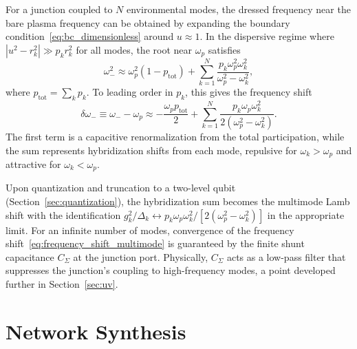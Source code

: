 \documentclass[reprint, floatfix, superscriptaddress, amsmath, amssymb, longbibliography]{revtex4-2}
\begin{document}
For a junction coupled to $N$ environmental modes, the dressed frequency near the bare plasma frequency can be obtained by expanding the boundary condition~\eqref{eq:bc_dimensionless} around $u \approx 1$. In the dispersive regime where $|u^2 - r_k^2| \gg p_k r_k^2$ for all modes, the root near $\omega_p$ satisfies
\begin{equation}
\omega_-^2 \approx \omega_p^2(1-p_\mathrm{tot}) + \sum_{k=1}^{N} \frac{p_k \omega_p^2 \omega_k^2}{\omega_p^2 - \omega_k^2},
\label{eq:omega_minus_multimode}
\end{equation}
where $p_\mathrm{tot} = \sum_k p_k$. To leading order in $p_k$, this gives the frequency shift
\begin{equation}
\delta\omega_- \equiv \omega_- - \omega_p \approx -\frac{\omega_p p_\mathrm{tot}}{2} + \sum_{k=1}^{N} \frac{p_k \omega_p \omega_k^2}{2(\omega_p^2 - \omega_k^2)}.
\label{eq:frequency_shift_multimode}
\end{equation}
The first term is a capacitive renormalization from the total participation, while the sum represents hybridization shifts from each mode, repulsive for $\omega_k > \omega_p$ and attractive for $\omega_k < \omega_p$.

Upon quantization and truncation to a two-level qubit (Section~\ref{sec:quantization}), the hybridization sum becomes the multimode Lamb shift with the identification $g_k^2/\Delta_k \leftrightarrow p_k\omega_p\omega_k^2/[2(\omega_p^2 - \omega_k^2)]$ in the appropriate limit. For an infinite number of modes, convergence of the frequency shift~\eqref{eq:frequency_shift_multimode} is guaranteed by the finite shunt capacitance $C_\Sigma$ at the junction port. Physically, $C_\Sigma$ acts as a low-pass filter that suppresses the junction's coupling to high-frequency modes, a point developed further in Section~\ref{sec:uv}.


\section{Network Synthesis}
\label{sec:synthesis}
\end{document}
